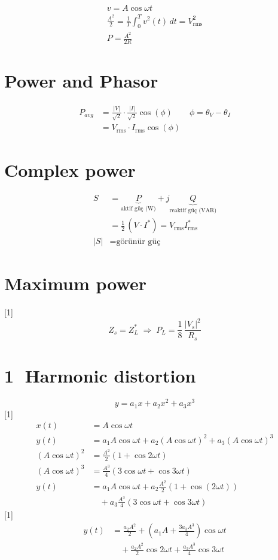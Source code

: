 \documentclass[11pt,a4paper]{article}
\begin{document}

\begin{gather*}
v = A\cos\omega t\\
\frac{A^2}{2} = \frac{1}{T}\int_0^T v^2(t)\,dt = V_{\mathrm{rms}}^2\\
P = \frac{A^2}{2R}
\end{gather*}

\section{Power and Phasor}
\begin{align*}
P_{avg} &= \frac{|V|}{\sqrt{2}}\cdot\frac{|I|}{\sqrt{2}}\cos(\phi) \qquad \phi=\theta_V-\theta_I\\
&= V_{\mathrm{rms}}\cdot I_{\mathrm{rms}}\cos(\phi)
\end{align*}

\section{Complex power}
\begin{align*}
S &= \underbrace{P}_{\text{aktif güç (W)}} + j\underbrace{Q}_{\text{reaktif güç (VAR)}}\\
&= \tfrac{1}{2}\,(V\cdot I^{*}) = V_{\mathrm{rms}}I_{\mathrm{rms}}^{*}\\
|S| &= \text{görünür güç}
\end{align*}

\section{Maximum power}
[1]
\[ Z_s = Z_L^{*} \;\Rightarrow\; P_L = \frac{1}{8}\,\frac{|V_s|^2}{R_s} \]

\section{\textcircled{1} Harmonic distortion}
\[ y = a_1x + a_2x^2 + a_3x^3 \]
[1]
\begin{align*}
x(t) &= A\cos\omega t\\
y(t) &= a_1 A\cos\omega t + a_2 (A\cos\omega t)^2 + a_3 (A\cos\omega t)^3\\
(A\cos\omega t)^2 &= \frac{A^2}{2}(1+\cos 2\omega t)\\
(A\cos\omega t)^3 &= \frac{A^3}{4}(3\cos\omega t+\cos 3\omega t)\\
y(t) &= a_1 A\cos\omega t + a_2\frac{A^2}{2}(1+\cos(2\omega t))\\
&\quad + a_3\frac{A^3}{4}(3\cos\omega t+\cos 3\omega t)
\end{align*}
[1]
\begin{align*}
y(t) &= \frac{a_2A^2}{2} + \left(a_1A+\frac{3a_3A^3}{4}\right)\cos\omega t\\
&\quad + \frac{a_2A^2}{2}\cos 2\omega t + \frac{a_3A^3}{4}\cos 3\omega t
\end{align*}
\end{document}

